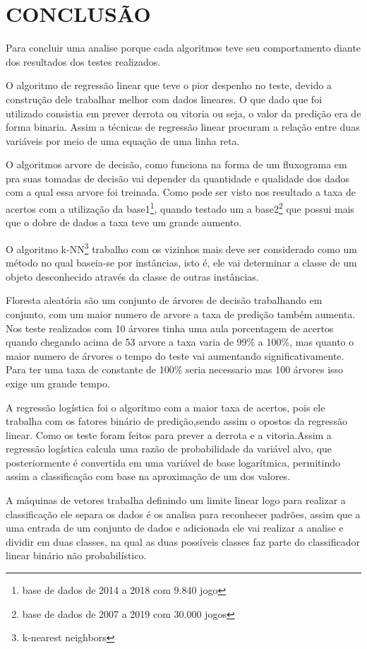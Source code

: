 \newpage
\section{CONCLUSÃO}
Para concluir uma analise porque cada algoritmos teve seu comportamento diante dos resultados dos testes realizados. 

O algoritmo de regressão linear que teve o pior despenho no teste, devido a construção dele trabalhar melhor com dados lineares. O que dado que foi utilizado consistia em prever derrota ou vitoria ou seja, o valor da predição era de forma binaria. Assim a técnicas de regressão linear procuram a relação entre duas variáveis por meio de uma equação de uma linha reta.

O algoritmos arvore de decisão, como funciona na forma de um fluxograma em pra suas tomadas de decisão vai depender da quantidade e qualidade dos dados com a qual essa arvore foi treinada. Como pode ser visto nos resultado a taxa de acertos com a utilização da base1\footnote[4]{base de dados de 2014 a 2018 com 9.840 jogo}, quando testado um a base2\footnote[5]{base de dados de 2007 a 2019 com 30.000 jogos} que possui mais que o dobre de dados a taxa teve um grande aumento.

O algoritmo k-NN\footnote[3]{k-nearest neighbors} trabalho com os vizinhos mais deve ser considerado como um método
no qual baseia-se por instâncias, isto é, ele vai determinar a classe de um objeto
desconhecido através da classe de outras instâncias.

Floresta aleatória são um conjunto de árvores de decisão trabalhando em conjunto, com um maior numero de arvore a taxa de predição também aumenta. Nos teste realizados com 10 árvores tinha uma aula porcentagem de acertos quando chegando acima de 53 arvore a taxa varia de 99\% a 100\%, mas quanto o maior numero de árvores o tempo do teste vai aumentando significativamente. Para ter uma taxa de constante de 100\% seria necessario mas 100 árvores isso exige um grande tempo.

A regressão logística foi o algoritmo com a maior taxa de acertos, pois ele trabalha com os fatores binário de predição,sendo assim o opostos da regressão linear. Como os teste foram feitos para prever a derrota e a vitoria.Assim a regressão logística calcula uma razão de probabilidade da variável alvo, que posteriormente é convertida em uma variável de base logarítmica, permitindo assim a classificação com base na aproximação de um dos valores. 

A máquinas de vetores trabalha definindo um limite linear logo para realizar a classificação ele separa os dados é os analisa para reconhecer padrões, assim que a uma entrada de um conjunto de dados e adicionada ele vai realizar a analise e dividir em duas classes, na qual as duas possíveis classes faz parte do classificador linear binário não probabilístico.





